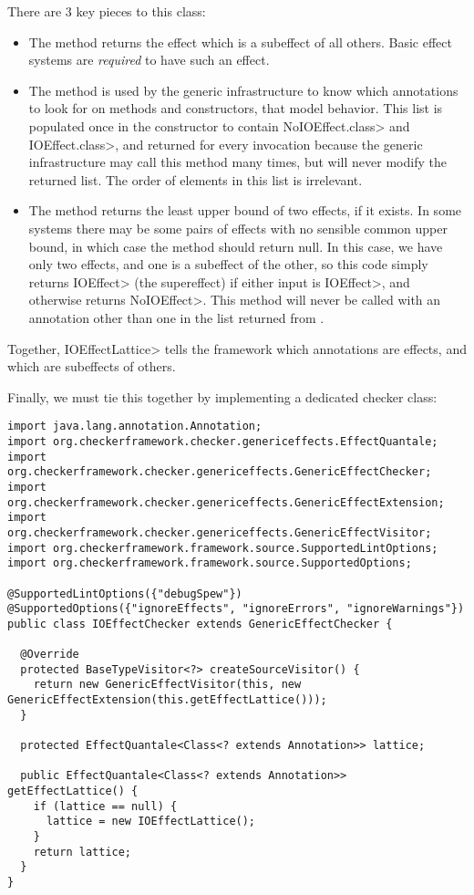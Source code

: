 There are 3 key pieces to this class:
\begin{itemize}
    \item The  method returns the effect which is a subeffect of all others.  Basic effect systems are \emph{required} to have such an effect.
    \item The  method is used by the generic infrastructure to know which annotations to look for on methods and constructors, that model behavior. This list is populated once in the constructor to contain \<NoIOEffect.class> and \<IOEffect.class>, and returned for every invocation because the generic infrastructure may call this method many times, but will never modify the returned list. The order of elements in this list is irrelevant.
    \item The  method returns the least upper bound of two effects, if it exists.  In some systems there may be some pairs of effects with no sensible common upper bound, in which case the method should return null. In this case, we have only two effects, and one is a subeffect of the other, so this code simply returns \<IOEffect> (the supereffect) if either input is \<IOEffect>, and otherwise returns \<NoIOEffect>.  This method will never be called with an annotation other than one in the list returned from .
\end{itemize}

Together, \<IOEffectLattice> tells the framework which annotations are effects, and which are subeffects of others.

Finally, we must tie this together by implementing a dedicated checker class:
\begin{Verbatim}
import java.lang.annotation.Annotation;
import org.checkerframework.checker.genericeffects.EffectQuantale;
import org.checkerframework.checker.genericeffects.GenericEffectChecker;
import org.checkerframework.checker.genericeffects.GenericEffectExtension;
import org.checkerframework.checker.genericeffects.GenericEffectVisitor;
import org.checkerframework.framework.source.SupportedLintOptions;
import org.checkerframework.framework.source.SupportedOptions;

@SupportedLintOptions({"debugSpew"})
@SupportedOptions({"ignoreEffects", "ignoreErrors", "ignoreWarnings"})
public class IOEffectChecker extends GenericEffectChecker {

  @Override
  protected BaseTypeVisitor<?> createSourceVisitor() {
    return new GenericEffectVisitor(this, new GenericEffectExtension(this.getEffectLattice()));
  }

  protected EffectQuantale<Class<? extends Annotation>> lattice;

  public EffectQuantale<Class<? extends Annotation>> getEffectLattice() {
    if (lattice == null) {
      lattice = new IOEffectLattice();
    }
    return lattice;
  }
}
\end{Verbatim}

